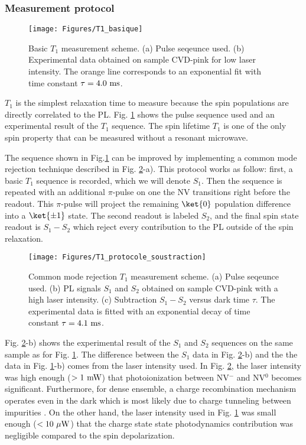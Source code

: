 \documentclass[a4paper,11pt]{report}
\begin{document}
\subsubsection{Measurement protocol}
\begin{figure}[h!]
\centering
\texttt{[image: Figures/T1\_basique]}
\caption{Basic $T_1$ measurement scheme. (a) Pulse seqeunce used. (b) Experimental data obtained on sample CVD-pink for low laser intensity. The orange line corresponds to an exponential fit with time constant $\tau=4.0\ \rm ms$.}
\label{T1 basique}
\end{figure}


$T_1$ is the simplest relaxation time to measure because the spin populations are directly correlated to the PL. Fig. \ref{T1 basique} shows the pulse sequence used and an experimental result of the $T_1$ sequence. The spin lifetime $T_1$ is one of the only spin property that can be measured without a resonant microwave.

The sequence shown in Fig.\ref{T1 basique} can be improved by implementing a common mode rejection technique described in Fig. \ref{T1 soustraction}-a). This protocol works as follow: first, a basic $T_1$ sequence is recorded, which we will denote $S_1$. Then the sequence is repeated with an additional $\pi$-pulse on one the NV transitions right before the readout. This $\pi$-pulse will project the remaining $\ket{0}$ population difference into a $\ket{\pm 1}$ state. The second readout is labeled $S_2$, and the final spin state readout is $S_1 -S_2$ which reject every contribution to the PL outside of the spin relaxation. 

\begin{figure}[h!]
\centering
\texttt{[image: Figures/T1\_protocole\_soustraction]}
\caption{Common mode rejection $T_1$ measurement scheme. (a) Pulse seqeunce used. (b) PL signals $S_1$ and $S_2$ obtained on sample CVD-pink with a high laser intensity. (c) Subtraction $S_1-S_2$ versus dark time $\tau$. The experimental data is fitted with an exponential decay of time constant $\tau=4.1\ \rm ms$.}
\label{T1 soustraction}
\end{figure}

Fig. \ref{T1 soustraction}-b) shows the experimental result of the $S_1$ and $S_2$ sequences on the same sample as for Fig. \ref{T1 basique}. The difference between the $S_1$ data in Fig. \ref{T1 soustraction}-b) and the the data in Fig. \ref{T1 basique}-b) comes from the laser intensity used. In Fig. \ref{T1 soustraction}, the laser intensity was high enough ($> 1\ \rm{mW}$) that photoionization between NV$^-$ and NV$^0$ becomes significant. Furthermore, for dense ensemble, a charge recombination mechanism operates even in the dark which is most likely due to charge tunneling between impurities \citep{choi2017depolarization, giri2018coupled, giri2019selective}. On the other hand, the laser intensity used in Fig. \ref{T1 basique} was small enough ($< 10\ \mu \rm{W}$) that the charge state state photodynamics contribution was negligible compared to the spin depolarization.
\end{document}
